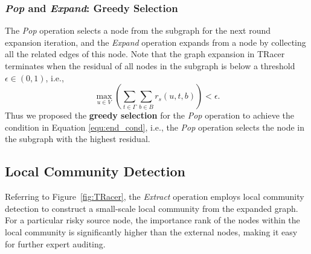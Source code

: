 \subsubsection{\textit{Pop} and \textit{Expand}: Greedy Selection}
The \textit{Pop} operation selects a node from the subgraph for the next round expansion iteration, and the \textit{Expand} operation expands from a node by collecting all the related edges of this node.
Note that the graph expansion in TRacer terminates when the residual of all nodes in the subgraph is below a threshold $\epsilon \in (0,1)$, i.e.,
\begin{equation}
    \max\limits_{u \in V}(\sum\limits_{t \in \Gamma}\sum\limits_{b \in B}r_s(u,t,b)) < \epsilon.
    \label{equ:end_cond}
\end{equation}
Thus we proposed the \textbf{greedy selection} for the \textit{Pop} operation to achieve the condition in Equation \ref{equ:end_cond}, i.e., the \textit{Pop} operation selects the node in the subgraph with the highest residual.

\subsection{Local Community Detection}
Referring to Figure~\ref{fig:TRacer}, the \textit{Extract} operation employs local community detection to construct a small-scale local community from the expanded graph. For a particular risky source node, the importance rank of the nodes within the local community is significantly higher than the external nodes, making it easy for further expert auditing.


